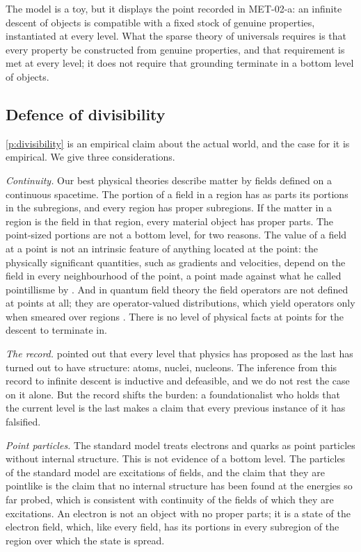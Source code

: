 \documentclass{situationist-preprint}
\begin{document}
The model is a toy, but it displays the point recorded in MET-02-a: an infinite descent of objects is compatible with a fixed stock of genuine properties, instantiated at every level. What the sparse theory of universals requires is that every property be constructed from genuine properties, and that requirement is met at every level; it does not require that grounding terminate in a bottom level of objects.

\subsection{Defence of divisibility}\label{s:divisibility}

\ref{p:divisibility} is an empirical claim about the actual world, and the case for it is empirical. We give three considerations.

\emph{Continuity.} Our best physical theories describe matter by fields defined on a continuous spacetime. The portion of a field in a region has as parts its portions in the subregions, and every region has proper subregions. If the matter in a region is the field in that region, every material object has proper parts. The point-sized portions are not a bottom level, for two reasons. The value of a field at a point is not an intrinsic feature of anything located at the point: the physically significant quantities, such as gradients and velocities, depend on the field in every neighbourhood of the point, a point made against what he called pointillisme by \citet{Butterfield2006}. And in quantum field theory the field operators are not defined at points at all; they are operator-valued distributions, which yield operators only when smeared over regions \citep{StreaterWightman1964}. There is no level of physical facts at points for the descent to terminate in.

\emph{The record.} \citet{Schaffer2003} pointed out that every level that physics has proposed as the last has turned out to have structure: atoms, nuclei, nucleons. The inference from this record to infinite descent is inductive and defeasible, and we do not rest the case on it alone. But the record shifts the burden: a foundationalist who holds that the current level is the last makes a claim that every previous instance of it has falsified.

\emph{Point particles.} The standard model treats electrons and quarks as point particles without internal structure. This is not evidence of a bottom level. The particles of the standard model are excitations of fields, and the claim that they are pointlike is the claim that no internal structure has been found at the energies so far probed, which is consistent with continuity of the fields of which they are excitations. An electron is not an object with no proper parts; it is a state of the electron field, which, like every field, has its portions in every subregion of the region over which the state is spread.
\end{document}
